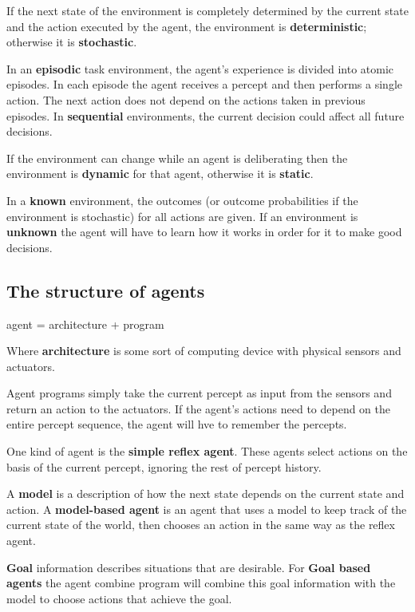 \documentclass{article}
\begin{document}
If the next state of the environment is completely determined by the current state and the action executed by the agent, the environment is \textbf{deterministic}; otherwise it is \textbf{stochastic}. \newline

In an \textbf{episodic} task environment, the agent's experience is divided into atomic episodes. In each episode the agent receives a percept and then performs a single action. The next action does not depend on the actions taken in previous episodes. In \textbf{sequential} environments, the current decision could affect all future decisions. \newline 

If the environment can change while an agent is deliberating then the environment is \textbf{dynamic} for that agent, otherwise it is \textbf{static}. \newline

In a \textbf{known} environment, the outcomes (or outcome probabilities if the environment is stochastic) for all actions are given. If an environment is \textbf{unknown} the agent will have to learn how it works in order for it to make good decisions.

\subsection{The structure of agents}

agent = architecture + program

Where \textbf{architecture} is some sort of computing device with physical sensors and actuators.

Agent programs simply take the current percept as input from the sensors and return an action to the actuators. If the agent's actions need to depend on the entire percept sequence, the agent will hve to remember the percepts.

One kind of agent is the \textbf{simple reflex agent}. These agents select actions on the basis of the current percept, ignoring the rest of percept history. \

A \textbf{model} is a description of how the next state depends on the current state and action. A \textbf{model-based agent} is an agent that uses a model to keep track of the current state of the world, then chooses an action in the same way as the reflex agent. \newline

\textbf{Goal} information describes situations that are desirable. For \textbf{Goal based agents} the agent combine program will combine this goal information with the model to choose actions that achieve the goal. \newline
\end{document}
